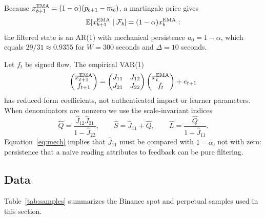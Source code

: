 \documentclass[12pt]{article}
\theoremstyle{definition}
\theoremstyle{remark}
\newcommand{\E}{\mathbb{E}}
\begin{document}
Because $x^{\rm EMA}_{b+1}=(1-\alpha)(p_{b+1}-m_b)$, a martingale price gives
\begin{equation}\label{eq:mech}
\E[x^{\rm EMA}_{b+1}\mid\mathcal F_b]=(1-\alpha)x^{\rm EMA}_b :
\end{equation}
the filtered state is an AR(1) with mechanical persistence $a_0=1-\alpha$, which equals $29/31\approx0.9355$ for $W=300$ seconds and $\Delta=10$ seconds.

Let $f_t$ be signed flow. The empirical VAR(1)
\begin{equation}\label{eq:var}
\begin{pmatrix}x^{\rm EMA}_{t+1}\\ f_{t+1}\end{pmatrix}=\begin{pmatrix}J_{11}&J_{12}\\ J_{21}&J_{22}\end{pmatrix}\begin{pmatrix}x^{\rm EMA}_t\\ f_t\end{pmatrix}+e_{t+1}
\end{equation}
has reduced-form coefficients, not authenticated impact or learner parameters. When denominators are nonzero we use the scale-invariant indices
\begin{equation}\label{eq:QS}
\hat Q=\frac{\hat J_{12}\hat J_{21}}{1-\hat J_{22}},\qquad\hat S=\hat J_{11}+\hat Q,\qquad\hat L=\frac{\hat Q}{1-\hat J_{11}} .
\end{equation}
Equation~\eqref{eq:mech} implies that $\hat J_{11}$ must be compared with $1-\alpha$, not with zero: persistence that a naive reading attributes to feedback can be pure filtering.

\subsection{Data}

Table~\ref{tab:samples} summarizes the Binance spot and perpetual samples used in this section.
\end{document}
